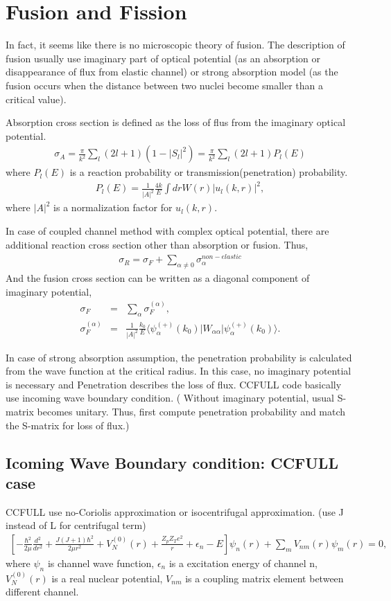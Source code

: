 \documentclass[11pt]{book}
\def\la{\langle}
\def\ra{\rangle}
\newcommand{\bea}{\begin{eqnarray}}
\newcommand{\eea}{\end{eqnarray}}
\newcommand{\no}{\nonumber \\}
\begin{document}
\chapter{Fusion and Fission} 
In fact, it seems like there is no microscopic theory of fusion. 
The description of fusion usually use imaginary part of optical potential
(as an absorption or disappearance of flux from elastic channel) or strong 
absorption model (as the fusion occurs when the distance between 
two nuclei become smaller than a critical value). 

Absorption cross section is defined as the loss of flus from the imaginary 
optical potential. 
\bea 
\sigma_A=\frac{\pi}{k^2}\sum_{l}(2l+1)(1-|S_l|^2)
        =\frac{\pi}{k^2}\sum_{l}(2l+1)P_l(E)
\eea 
where $P_l(E)$ is a reaction probability or transmission(penetration) probability. 
\bea 
P_l(E)=\frac{1}{|A|^2}\frac{4 k}{E}\int dr W(r)|u_l(k,r)|^2,
\eea 
where $|A|^2$ is a normalization factor for $u_l(k,r)$.

In case of coupled channel method with complex optical potential,
there are additional reaction cross section other than absorption or fusion. 
Thus,
\bea 
\sigma_R=\sigma_F+\sum_{\alpha\neq 0}\sigma_\alpha^{non-elastic} 
\eea 
And the fusion cross section can be written as a diagonal component
of imaginary potential,
\bea 
\sigma_F&=&\sum_{\alpha}\sigma_F^{(\alpha)},\no 
\sigma_F^{(\alpha)}&=&\frac{1}{|A|^2}\frac{k_0}{E}
   \la \psi^{(+)}_\alpha(k_0)|W_{\alpha\alpha}|\psi^{(+)}_\alpha(k_0)\ra .
\eea 

In case of strong absorption assumption, the penetration probability is calculated
from the wave function at the critical radius. In this case, no imaginary potential
is necessary and Penetration describes the loss of flux. CCFULL code basically
use incoming wave boundary condition. ( Without imaginary potential, usual S-matrix
becomes unitary. Thus, first compute penetration probability and match the S-matrix  
for loss of flux.)

\section{Icoming Wave Boundary condition: CCFULL case} 
CCFULL use no-Coriolis approximation or isocentrifugal approximation. (use J instead 
of L for centrifugal term)
\bea 
\left[-\frac{\hbar^2}{2\mu}\frac{d^2}{dr^2}+\frac{J(J+1)\hbar^2}{2\mu r^2}
  +V_N^{(0)}(r)+\frac{Z_p Z_T e^2}{r}+\epsilon_n-E\right]\psi_n(r)
 +\sum_{m}V_{nm}(r)\psi_m(r)=0,
\eea 
where $\psi_n$ is channel wave function, $\epsilon_n$ is a excitation energy 
of channel n, $V_N^{(0)}(r)$ is a real nuclear potential,
$V_{nm}$ is a coupling matrix element between different channel. 
\end{document}
